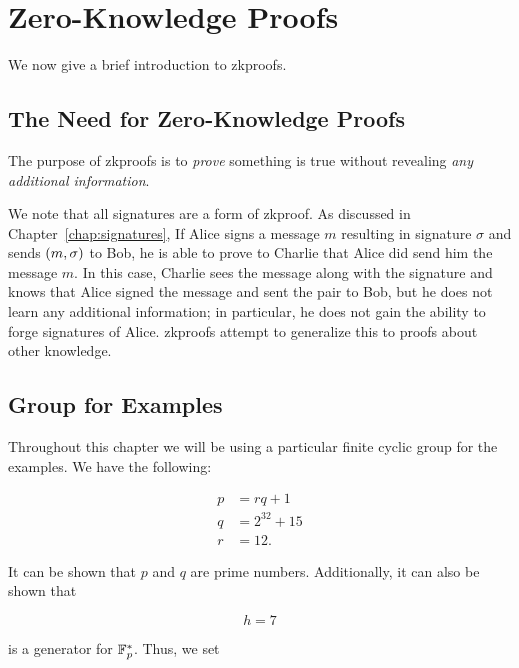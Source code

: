 \chapter{Zero-Knowledge Proofs}
\label{chap:zkproofs}

We now give a brief introduction to \glspl{zkproof}.



\section{The Need for Zero-Knowledge Proofs}

The purpose of \glspl{zkproof} is to \emph{prove}
something is true without revealing \emph{any additional information}.

We note that all \glspl{signature} are a form of \gls{zkproof}.
As discussed in Chapter~\ref{chap:signatures},
If Alice signs a message $m$ resulting in signature $\sigma$
and sends $\left( m,\sigma \right)$ to Bob,
he is able to prove to Charlie that Alice did send him the message $m$.
In this case, Charlie sees the message along with the signature
and knows that Alice signed the message and sent the pair to Bob,
but he does not learn any additional information;
in particular, he does not gain the ability to forge
signatures of Alice.
\Glspl{zkproof} attempt to generalize this to proofs about
other knowledge.



\section{Group for Examples}
\label{sec:zkproofs_group}

Throughout this chapter we will be using a particular
\gls{finite cyclic group} for the examples.
We have the following:

\begin{align}
    p &= rq + 1 \nonumber\\
    q &= 2^{32} + 15 \nonumber\\
    r &= 12.
\end{align}

\noindent
It can be shown that $p$ and $q$ are prime numbers.
Additionally, it can also be shown that

\begin{equation}
    h = 7
\end{equation}

\noindent
is a generator for $\mathbb{F}_{p}^{*}$.
Thus, we set

